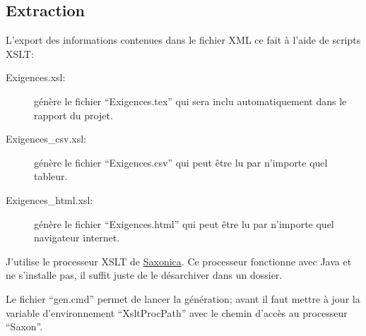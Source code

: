 \documentclass[11pt,a4paper,french,twoside,openright]{article}
\begin{document}
\subsection{Extraction}\label{extraction}

L'export des informations contenues dans le fichier XML ce fait à l'aide de scripts XSLT:
\begin{description}
\item[Exigences.xsl:] génère le fichier \enquote{Exigences.tex} qui sera inclu automatiquement dans le rapport du projet.
\item[Exigences\_csv.xsl:] génère le fichier \enquote{Exigences.csv} qui peut être lu par n'importe quel tableur.
\item[Exigences\_html.xsl:] génère le fichier \enquote{Exigences.html} qui peut être lu par n'importe quel navigateur internet.
\end{description}

J'utilise le processeur XSLT de \href{http://www.saxonica.com/download/opensource.xml}{Saxonica}. Ce processeur fonctionne avec Java et ne s'installe pas, il suffit juste de le désarchiver dans un dossier.

Le fichier \enquote{gen.cmd} permet de lancer la génération; avant il faut mettre à jour la variable d'environnement
\enquote{XsltProcPath} avec le chemin d'accès au processeur \enquote{Saxon}.
\end{document}
